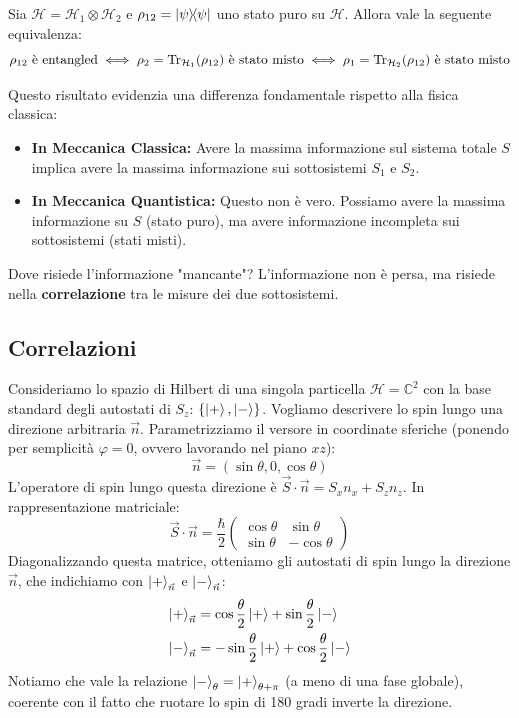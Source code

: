 \begin{theorem}
    Sia \(\mathcal{H} = \mathcal{H}_1 \otimes \mathcal{H}_2\) e \(\rho_{12} = \dyad{\psi}{\psi}\) uno stato puro su \(\mathcal{H}\).
    Allora vale la seguente equivalenza:
    \[
        \rho_{12} \text{ è entangled} 
        \iff \rho_2 = \Tr_{\mathcal{H}_1}(\rho_{12}) \text{ è stato misto}
        \iff \rho_1 = \Tr_{\mathcal{H}_2}(\rho_{12}) \text{ è stato misto}
    \]
\end{theorem}

Questo risultato evidenzia una differenza fondamentale rispetto alla fisica classica:
\begin{itemize}
    \item \textbf{In Meccanica Classica:} Avere la massima informazione sul sistema totale \(S\) implica avere la massima informazione sui sottosistemi \(S_1\) e \(S_2\).
    \item \textbf{In Meccanica Quantistica:} Questo non è vero. Possiamo avere la massima informazione su \(S\) (stato puro), ma avere informazione incompleta sui sottosistemi (stati misti).
\end{itemize}

Dove risiede l'informazione "mancante"?
L'informazione non è persa, ma risiede nella \textbf{correlazione} tra le misure dei due sottosistemi.

\subsection{Correlazioni}

Consideriamo lo spazio di Hilbert di una singola particella \(\mathcal{H} = \mathbb{C}^2\) con la base standard degli autostati di \(S_z\): \(\{\ket{+}, \ket{-}\}\).
Vogliamo descrivere lo spin lungo una direzione arbitraria \(\vec{n}\). Parametrizziamo il versore in coordinate sferiche (ponendo per semplicità \(\varphi=0\), ovvero lavorando nel piano \(xz\)):
\[
    \vec{n} = (\sin\theta, 0, \cos\theta)
\]
L'operatore di spin lungo questa direzione è \(\vec{S} \cdot \vec{n} = S_x n_x + S_z n_z\). In rappresentazione matriciale:
\[
    \vec{S} \cdot \vec{n} = \frac{\hbar}{2} 
    \begin{pmatrix}
        \cos\theta & \sin\theta \\
        \sin\theta & -\cos\theta
    \end{pmatrix}
\]
Diagonalizzando questa matrice, otteniamo gli autostati di spin lungo la direzione \(\vec{n}\), che indichiamo con \(\ket{+}_{\vec{n}}\) e \(\ket{-}_{\vec{n}}\):
\begin{align}
    \ket{+}_{\vec{n}} &= \cos\frac{\theta}{2}\ket{+} + \sin\frac{\theta}{2}\ket{-} \\
    \ket{-}_{\vec{n}} &= -\sin\frac{\theta}{2}\ket{+} + \cos\frac{\theta}{2}\ket{-}
\end{align}
Notiamo che vale la relazione \(\ket{-}_{\theta} = \ket{+}_{\theta + \pi}\) (a meno di una fase globale), coerente con il fatto che ruotare lo spin di 180 gradi inverte la direzione.

